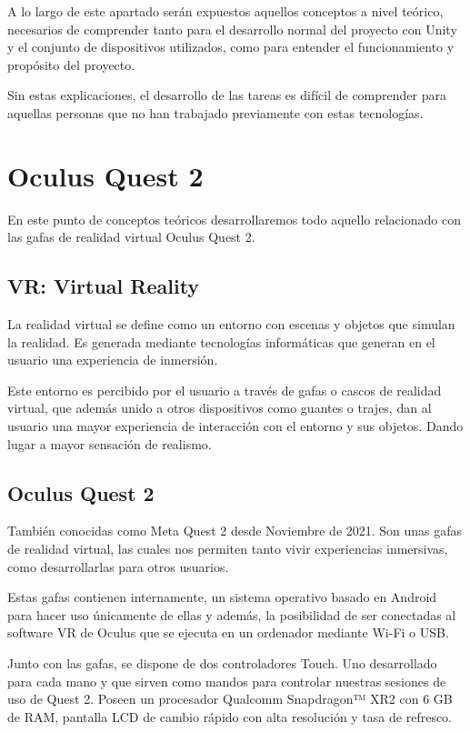 
A lo largo de este apartado serán expuestos aquellos conceptos a nivel teórico, necesarios de comprender tanto para el desarrollo normal del proyecto con Unity y el conjunto de dispositivos utilizados, como para entender el funcionamiento y propósito del proyecto.

Sin estas explicaciones, el desarrollo de las tareas es difícil de comprender para aquellas personas que no han trabajado previamente con estas tecnologías. 

\section{Oculus Quest 2}

En este punto de conceptos teóricos desarrollaremos todo aquello relacionado con las gafas de realidad virtual Oculus Quest 2. 

\subsection{VR: Virtual Reality}
La realidad virtual\cite{VR} se define como un entorno con escenas y objetos que simulan la realidad. Es generada mediante tecnologías informáticas que generan en el usuario una experiencia de inmersión.

Este entorno es percibido por el usuario a través de gafas o cascos de realidad virtual, que además unido a otros dispositivos como guantes o trajes, dan al usuario una mayor experiencia de interacción con el entorno y sus objetos. Dando lugar a mayor sensación de realismo.

\subsection{Oculus Quest 2}
También conocidas como Meta Quest 2 desde Noviembre de 2021. 
Son unas gafas de realidad virtual, las cuales nos permiten tanto vivir experiencias inmersivas, como desarrollarlas para otros usuarios.

Estas gafas contienen internamente, un sistema operativo basado en Android para hacer uso únicamente de ellas y además, la posibilidad de ser conectadas al software VR de Oculus que se ejecuta en un ordenador mediante Wi-Fi o USB.

Junto con las gafas, se dispone de dos controladores Touch. Uno desarrollado para cada mano y que sirven como mandos para controlar nuestras sesiones de uso de Quest 2.
Poseen un procesador Qualcomm Snapdragon™ XR2 con 6 GB de RAM, pantalla LCD de cambio rápido con alta resolución y tasa de refresco.


